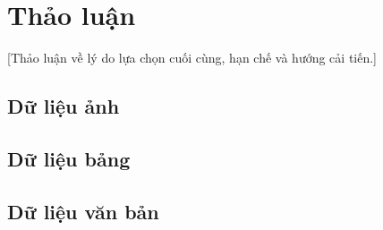 \section{Thảo luận}
\label{sec:discussion}

[Thảo luận về lý do lựa chọn cuối cùng, hạn chế và hướng cải tiến.]

\subsection{Dữ liệu ảnh}

\subsection{Dữ liệu bảng}

\subsection{Dữ liệu văn bản}
